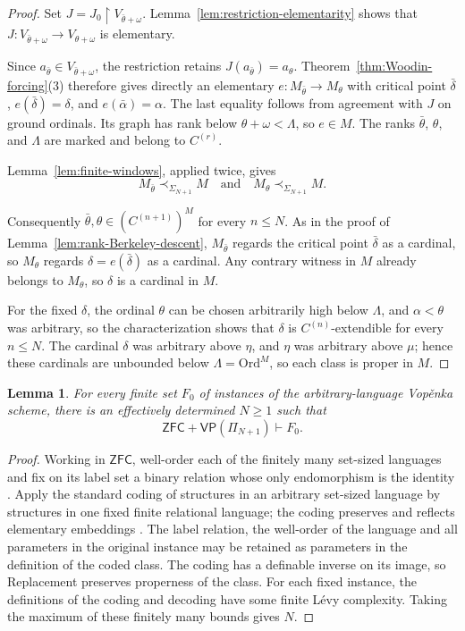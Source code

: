 \documentclass[11pt,a4paper]{amsart}
\newcommand{\VP}{\mathsf{VP}}
\newcommand{\ZFC}{\mathsf{ZFC}}
\newcommand{\Ord}{\mathrm{Ord}}
\newcommand{\restr}{\mathbin{\upharpoonright}}
\theoremstyle{plain}
\newtheorem{lemma}[theorem]{Lemma}
\theoremstyle{definition}
\theoremstyle{remark}
\begin{document}
\begin{proof}
Set $J=J_0\restr V_{\bar\theta+\omega}$.  Lemma~\ref{lem:restriction-elementarity} shows that $J:V_{\bar\theta+\omega}\longrightarrow V_{\theta+\omega}$ is elementary.

{\color{auditgreen}Since $a_{\bar\theta}\in V_{\bar\theta+\omega}$, the restriction retains $J(a_{\bar\theta})=a_\theta$.  Theorem~\ref{thm:Woodin-forcing}(3) therefore gives directly an elementary $e:M_{\bar\theta}\to M_\theta$ with critical point $\bar\delta$, $e(\bar\delta)=\delta$, and $e(\bar\alpha)=\alpha$.  The last equality follows from agreement with $J$ on ground ordinals.  Its graph has rank below $\theta+\omega<\Lambda$, so $e\in M$.}  The ranks $\bar\theta$, $\theta$, and $\Lambda$ are marked and belong to $C^{(r)}$.

Lemma~\ref{lem:finite-windows}, applied twice, gives
\[
M_{\bar\theta}\prec_{\Sigma_{N+1}}M
\quad\text{and}\quad
M_\theta\prec_{\Sigma_{N+1}}M.
\]

Consequently $\bar\theta,\theta\in(C^{(n+1)})^M$ for every $n\leq N$.  As in the proof of Lemma~\ref{lem:rank-Berkeley-descent}, $M_{\bar\theta}$ regards the critical point $\bar\delta$ as a cardinal, so $M_\theta$ regards $\delta=e(\bar\delta)$ as a cardinal.  Any contrary witness in $M$ already belongs to $M_\theta$, so $\delta$ is a cardinal in $M$.

For the fixed $\delta$, the ordinal $\theta$ can be chosen arbitrarily high below $\Lambda$, and $\alpha<\theta$ was arbitrary, so the characterization shows that $\delta$ is $C^{(n)}$-extendible for every $n\leq N$.  The cardinal $\delta$ was arbitrary above $\eta$, and $\eta$ was arbitrary above $\mu$; hence these cardinals are unbounded below $\Lambda=\Ord^M$, so each class is proper in $M$.
\end{proof}

\begingroup

\begin{lemma}\label{lem:finite-language-reduction}
For every finite set $F_0$ of instances of the arbitrary-language Vop\v{e}nka scheme, there is an effectively determined $N\geq1$ such that
\[
\ZFC+\VP(\Pi_{N+1})\vdash F_0.
\]
\end{lemma}

\begin{proof}
{\color{auditgreen}Working in $\ZFC$, well-order each of the finitely many set-sized languages and fix on its label set a binary relation whose only endomorphism is the identity \cite[Theorem~2]{VopenkaPultrHedrlin}.  Apply the standard coding} of structures in an arbitrary set-sized language by structures in one fixed finite relational language; the coding preserves and reflects elementary embeddings \cite[pp.~2--3]{BrookeTaylor}.  {\color{auditgreen}The label relation, the well-order of the language and all parameters in the original instance may be retained as parameters} in the definition of the coded class.  {\color{auditgreen}The coding has a definable inverse on its image, so Replacement preserves properness of the class.  For each fixed instance, the definitions of the coding and decoding have some finite L\'evy complexity.}  Taking the maximum of these finitely many bounds gives $N$.
\end{proof}
\endgroup
\end{document}
